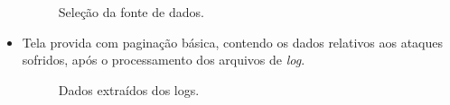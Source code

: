 \begin{itemize}
    \begin{figure}[h!tp]
        \centering
        \caption{\label{figura:crickets_logs} Seleção da fonte de dados.}
    \end{figure}

    \clearpage
    \item Tela provida com paginação básica, contendo os dados relativos aos ataques sofridos, após o processamento dos arquivos de \textit{log}.

    \begin{figure}[h!tp]
        \centering
        \caption{\label{figura:crickets_entries} Dados extraídos dos logs.}
    \end{figure}


\end{itemize}
